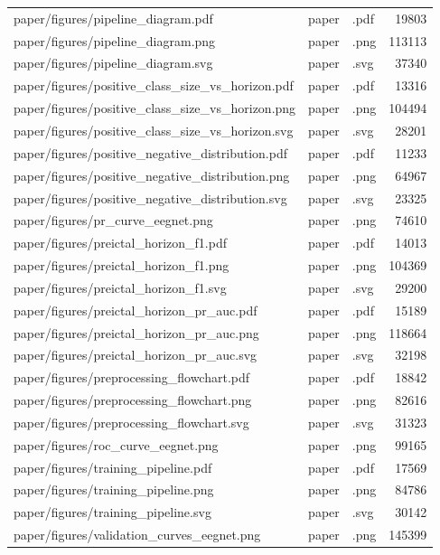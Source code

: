 \begin{tabular}{lllr}
paper/figures/pipeline\_diagram.pdf & paper & .pdf & 19803 \\
paper/figures/pipeline\_diagram.png & paper & .png & 113113 \\
paper/figures/pipeline\_diagram.svg & paper & .svg & 37340 \\
paper/figures/positive\_class\_size\_vs\_horizon.pdf & paper & .pdf & 13316 \\
paper/figures/positive\_class\_size\_vs\_horizon.png & paper & .png & 104494 \\
paper/figures/positive\_class\_size\_vs\_horizon.svg & paper & .svg & 28201 \\
paper/figures/positive\_negative\_distribution.pdf & paper & .pdf & 11233 \\
paper/figures/positive\_negative\_distribution.png & paper & .png & 64967 \\
paper/figures/positive\_negative\_distribution.svg & paper & .svg & 23325 \\
paper/figures/pr\_curve\_eegnet.png & paper & .png & 74610 \\
paper/figures/preictal\_horizon\_f1.pdf & paper & .pdf & 14013 \\
paper/figures/preictal\_horizon\_f1.png & paper & .png & 104369 \\
paper/figures/preictal\_horizon\_f1.svg & paper & .svg & 29200 \\
paper/figures/preictal\_horizon\_pr\_auc.pdf & paper & .pdf & 15189 \\
paper/figures/preictal\_horizon\_pr\_auc.png & paper & .png & 118664 \\
paper/figures/preictal\_horizon\_pr\_auc.svg & paper & .svg & 32198 \\
paper/figures/preprocessing\_flowchart.pdf & paper & .pdf & 18842 \\
paper/figures/preprocessing\_flowchart.png & paper & .png & 82616 \\
paper/figures/preprocessing\_flowchart.svg & paper & .svg & 31323 \\
paper/figures/roc\_curve\_eegnet.png & paper & .png & 99165 \\
paper/figures/training\_pipeline.pdf & paper & .pdf & 17569 \\
paper/figures/training\_pipeline.png & paper & .png & 84786 \\
paper/figures/training\_pipeline.svg & paper & .svg & 30142 \\
paper/figures/validation\_curves\_eegnet.png & paper & .png & 145399 \\

\end{tabular}
